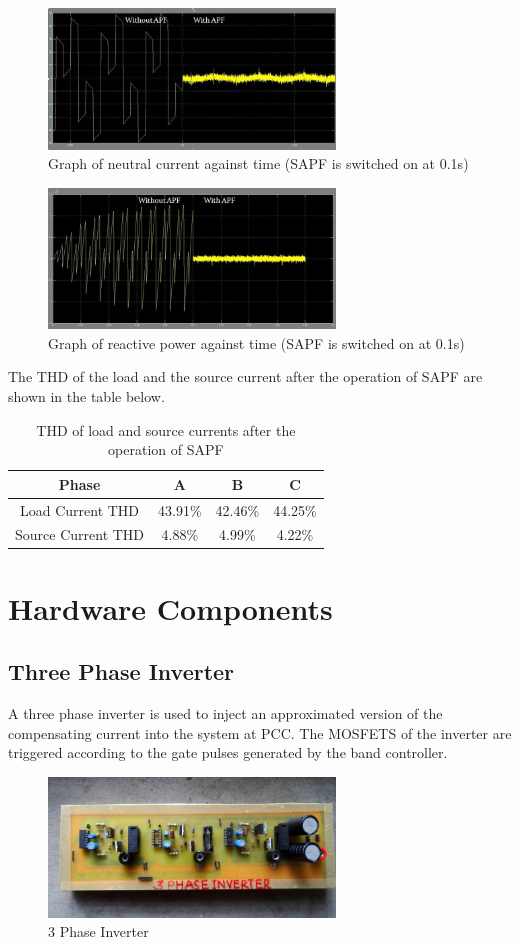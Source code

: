 \documentclass[journal,twoside]{IEEEtran}
\begin{document}
\begin{figure}[!ht]
\centering
\includegraphics[width=3in]{3}
\caption{Graph of neutral current against time (SAPF is switched on at
0.1s)}
\label{f3}
\end{figure}

\begin{figure}[!ht]
\centering
\includegraphics[width=3in]{4}
\caption{Graph of reactive power against time (SAPF is switched on at
0.1s)}
\label{f4}
\end{figure}


The THD of the load and the source current after the
operation of SAPF are shown in the table below.


\begin{table}[!ht]
\caption{THD of load and source currents after the operation of SAPF}
\label{t1}
\centering
\begin{tabular}{|c|c|c|c|}
\hline
Phase & A & B & C\\
\hline
Load Current THD & 43.91\% & 42.46\% & 44.25\%\\
\hline
Source Current THD & 4.88\% & 4.99\% & 4.22\%\\
\hline
\end{tabular}
\end{table}

\section{Hardware Components}
\subsection{Three Phase Inverter}
A three phase inverter is used to inject an approximated
version of the compensating current into the system at PCC.
The MOSFETS of the inverter are triggered according to the
gate pulses generated by the band controller.
\begin{figure}[!ht]
\centering
\includegraphics[width=3in]{5}
\caption{3 Phase Inverter}
\label{f5}
\end{figure}
\end{document}
